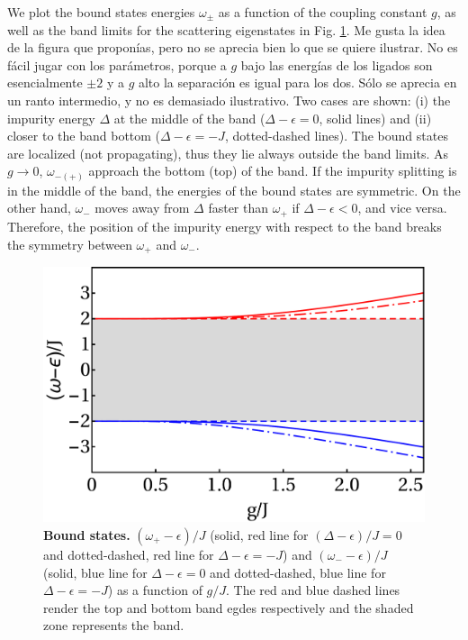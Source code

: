 \documentclass[aps,pra,twocolumn,floatfix,superscriptaddress]{revtex4-1}%
\begin{document}
We plot the bound states energies $\omega_\pm$ as a function of the coupling constant $g$, as well as the band limits for the scattering eigenstates in Fig. \ref{fig:E_bound}. {\color{red}Me gusta la idea de la figura que propon\'ias, pero no se aprecia bien lo que se quiere ilustrar. No es f\'acil jugar con los par\'ametros, porque a $g$ bajo las energ\'ias de los ligados son esencialmente $\pm 2$ y a $g$ alto la separaci\'on es igual para los dos. S\'olo se aprecia en un ranto intermedio, y no es demasiado ilustrativo.}
Two cases are shown: (i) the impurity energy $\Delta$ at the middle of the band ($\Delta-\epsilon=0$, solid lines) and (ii) closer to the band bottom  ($\Delta-\epsilon=-J$, dotted-dashed lines). 
The bound states are localized (not propagating), thus they lie always outside the band limits.
As $g\to 0$, $\omega_{-(+)}$   approach the bottom (top) of the band.
If  the impurity splitting  is in the middle of the band, the energies of the bound states are  symmetric.
On the other hand, $\omega_-$ moves away from $\Delta$ faster than $\omega_+$ if $\Delta-\epsilon<0$, and vice versa. Therefore, the position of the impurity energy with respect to the band breaks the symmetry between $\omega_+$ and $\omega_-$.

\begin{figure}[thb!]
\includegraphics[width=1\columnwidth]{E_bound_all.pdf}
\caption{{\bf Bound states.} $(\omega_+-\epsilon)/J$ (solid, red line for $(\Delta-\epsilon)/J=0$ and dotted-dashed, red line for $\Delta-\epsilon=-J$) and $(\omega_--\epsilon)/J$ (solid, blue line for $\Delta-\epsilon=0$ and dotted-dashed, blue line for $\Delta-\epsilon=-J$) as a function of $g/J$. The red and blue dashed lines render the top and bottom band egdes respectively and the shaded zone represents the band.}\label{fig:E_bound}
\end{figure}
 
\end{document}
